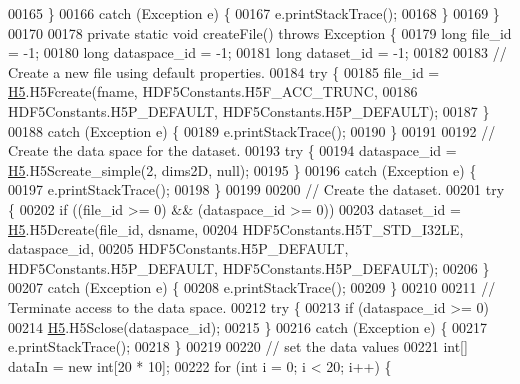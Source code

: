 \begin{DoxyCode}
00165         \}
00166         \textcolor{keywordflow}{catch} (Exception e) \{
00167             e.printStackTrace();
00168         \}
00169     \}
00170 
00178     \textcolor{keyword}{private} \textcolor{keyword}{static} \textcolor{keywordtype}{void} createFile() \textcolor{keywordflow}{throws} Exception \{
00179         \textcolor{keywordtype}{long} file\_id = -1;
00180         \textcolor{keywordtype}{long} dataspace\_id = -1;
00181         \textcolor{keywordtype}{long} dataset\_id = -1;
00182 
00183         \textcolor{comment}{// Create a new file using default properties.}
00184         \textcolor{keywordflow}{try} \{
00185             file\_id = \hyperlink{namespace_h5}{H5}.H5Fcreate(fname, HDF5Constants.H5F\_ACC\_TRUNC,
00186                     HDF5Constants.H5P\_DEFAULT, HDF5Constants.H5P\_DEFAULT);
00187         \}
00188         \textcolor{keywordflow}{catch} (Exception e) \{
00189             e.printStackTrace();
00190         \}
00191 
00192         \textcolor{comment}{// Create the data space for the dataset.}
00193         \textcolor{keywordflow}{try} \{
00194             dataspace\_id = \hyperlink{namespace_h5}{H5}.H5Screate\_simple(2, dims2D, null);
00195         \}
00196         \textcolor{keywordflow}{catch} (Exception e) \{
00197             e.printStackTrace();
00198         \}
00199 
00200         \textcolor{comment}{// Create the dataset.}
00201         \textcolor{keywordflow}{try} \{
00202             \textcolor{keywordflow}{if} ((file\_id >= 0) && (dataspace\_id >= 0))
00203                 dataset\_id = \hyperlink{namespace_h5}{H5}.H5Dcreate(file\_id, dsname,
00204                         HDF5Constants.H5T\_STD\_I32LE, dataspace\_id,
00205                         HDF5Constants.H5P\_DEFAULT, HDF5Constants.H5P\_DEFAULT, HDF5Constants.H5P\_DEFAULT);
00206         \}
00207         \textcolor{keywordflow}{catch} (Exception e) \{
00208             e.printStackTrace();
00209         \}
00210 
00211         \textcolor{comment}{// Terminate access to the data space.}
00212         \textcolor{keywordflow}{try} \{
00213             \textcolor{keywordflow}{if} (dataspace\_id >= 0)
00214                 \hyperlink{namespace_h5}{H5}.H5Sclose(dataspace\_id);
00215         \}
00216         \textcolor{keywordflow}{catch} (Exception e) \{
00217             e.printStackTrace();
00218         \}
00219 
00220         \textcolor{comment}{// set the data values}
00221         \textcolor{keywordtype}{int}[] dataIn = \textcolor{keyword}{new} \textcolor{keywordtype}{int}[20 * 10];
00222         \textcolor{keywordflow}{for} (\textcolor{keywordtype}{int} i = 0; i < 20; i++) \{

\end{DoxyCode}
